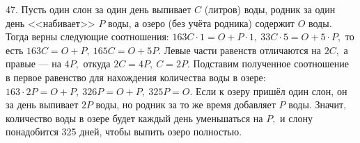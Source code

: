 47. Пусть один слон за один день выпивает $C$ (литров) воды, родник за один день <<набивает>> $P$ воды, а озеро (без учёта родника) содержит $O$ воды. Тогда верны следующие соотношения: $163C\cdot1=O+P\cdot1,\ 33C\cdot5=O+5\cdot P,$ то есть $163C=O+P,\ 165C=O+5P.$ Левые части равенств отличаются на $2C,$ а правые --- на $4P,$ откуда $2C=4P,\ C=2P.$ Подставим полученное соотношение в первое равенство для нахождения количества воды в озере: $163\cdot2P=O+P,\ 326P=O+P,\ 325P=O.$ Если к озеру пришёл один слон, он за день выпивает $2P$ воды, но родник за то же время добавляет $P$ воды. Значит, количество воды в озере будет каждый день уменьшаться на $P,$ и слону понадобится 325 дней, чтобы выпить озеро полностью.\\
